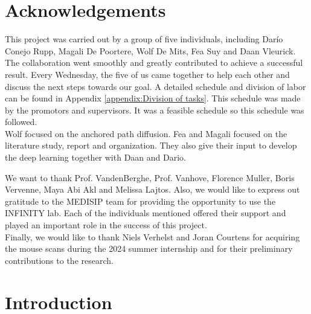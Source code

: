 \documentclass[twocolumn]{article}
\begin{document}
\tableofcontents
\newpage
\onecolumn
\listoffigures
\listoftables

\newpage
\section*{Acknowledgements}
This project was carried out by a group of five individuals, including Darío Conejo Rupp, Magali De Poortere, Wolf De Mits, Fea Suy and Daan Vleurick. The collaboration went smoothly and greatly contributed to achieve a successful result. Every Wednesday, the five of us came together to help each other and discuss the next steps towards our goal. A detailed schedule and division of labor can be found in Appendix \ref{appendix:Division of tasks}. This schedule was made by the promotors and supervisors. It was a feasible schedule so this schedule was followed.  \\

Wolf focused on the anchored path diffusion. Fea and Magali focused on the literature study, report and organization. They also give their input to develop the deep learning together with Daan and Dario.

We want to thank Prof. VandenBerghe, Prof. Vanhove, Florence Muller, Boris Vervenne, Maya Abi Akl and Melissa Lajtos. Also, we would like to express out gratitude to the MEDISIP team for providing the opportunity to use the INFINITY lab. Each of the individuals mentioned offered their support and played an important role in the success of this project. \\

Finally, we would like to thank Niels Verhelst and Joran Courtens for acquiring the mouse scans during the 2024 summer internship and for their preliminary contributions to the research.



\newpage
\section{Introduction}
\end{document}
